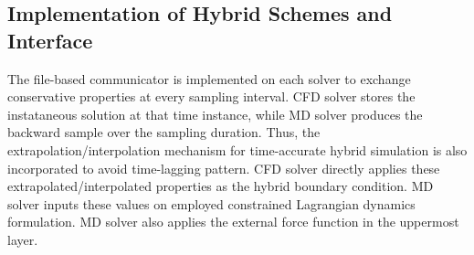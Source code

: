 \documentclass[]{aiaa-tc}%
\begin{document}






\subsection{Implementation of Hybrid Schemes and Interface}
\label{sec:numerics_hybrid}


The file-based communicator is implemented on each solver to exchange conservative
properties at every sampling interval. CFD solver stores the instataneous solution
at that time instance, while MD solver produces the backward sample over the
sampling duration. Thus, the extrapolation/interpolation mechanism for time-accurate
hybrid simulation\cite{JoCS2012} is also incorporated to avoid time-lagging pattern. 
CFD solver directly applies these extrapolated/interpolated properties as the 
hybrid boundary condition. MD solver inputs these values on employed constrained 
Lagrangian dynamics formulation. MD solver also applies the external force function
in the uppermost layer.
\end{document}
